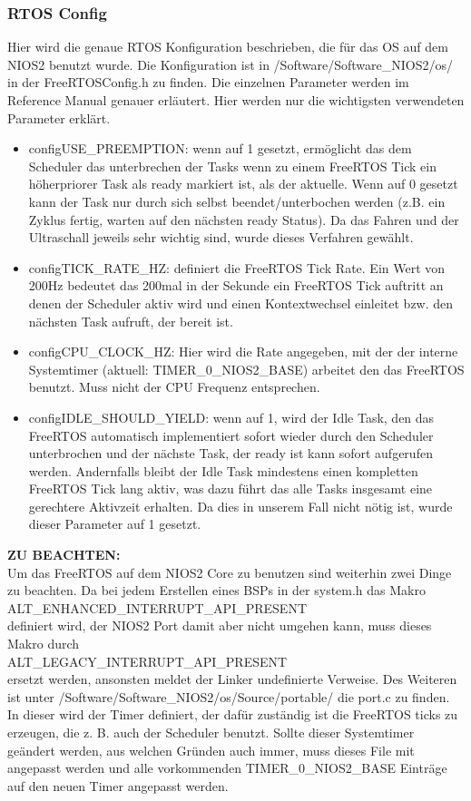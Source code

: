  \subsubsection{RTOS Config}
Hier wird die genaue RTOS Konfiguration beschrieben, die für das OS auf dem NIOS2 benutzt wurde. Die Konfiguration ist in /Software/Software\_NIOS2/os/ in der FreeRTOSConfig.h zu finden. Die einzelnen Parameter werden im Reference Manual genauer erläutert. Hier werden nur die wichtigsten verwendeten Parameter erklärt.
\begin{itemize}
 \item configUSE\_PREEMPTION: wenn auf 1 gesetzt, ermöglicht das dem Scheduler das unterbrechen der Tasks wenn zu einem FreeRTOS Tick ein höherpriorer Task als ready markiert ist, als der aktuelle. Wenn auf 0 gesetzt kann der Task nur durch sich selbst beendet/unterbochen werden (z.B. ein Zyklus fertig, warten auf den nächsten ready Status). Da das Fahren und der Ultraschall jeweils sehr wichtig sind, wurde dieses Verfahren gewählt.
 \item configTICK\_RATE\_HZ: definiert die FreeRTOS Tick Rate. Ein Wert von 200Hz bedeutet das 200mal in der Sekunde ein FreeRTOS Tick auftritt an denen der Scheduler aktiv wird und einen Kontextwechsel einleitet bzw. den nächsten Task aufruft, der bereit ist.
 \item configCPU\_CLOCK\_HZ: Hier wird die Rate angegeben, mit der der interne Systemtimer (aktuell: TIMER\_0\_NIOS2\_BASE) arbeitet den das FreeRTOS benutzt. Muss nicht der CPU Frequenz entsprechen.
 \item configIDLE\_SHOULD\_YIELD: wenn auf 1, wird der Idle Task, den das FreeRTOS automatisch implementiert sofort wieder durch den Scheduler unterbrochen und der nächste Task, der ready ist kann sofort aufgerufen werden. Andernfalls bleibt der Idle Task mindestens einen kompletten FreeRTOS Tick lang aktiv, was dazu führt das alle Tasks insgesamt eine gerechtere Aktivzeit erhalten. Da dies in unserem Fall nicht nötig ist, wurde dieser Parameter auf 1 gesetzt.
\end{itemize}
\textbf{ZU BEACHTEN:}\\Um das FreeRTOS auf dem NIOS2 Core zu benutzen sind weiterhin zwei Dinge zu beachten. Da bei jedem Erstellen eines BSPs in der system.h das Makro\\ ALT\_ENHANCED\_INTERRUPT\_API\_PRESENT\\ definiert wird, der NIOS2 Port damit aber nicht umgehen kann, muss dieses Makro durch\\ ALT\_LEGACY\_INTERRUPT\_API\_PRESENT\\ ersetzt werden, ansonsten meldet der Linker undefinierte Verweise. Des Weiteren ist unter /Software/Software\_NIOS2/os/Source/portable/ die port.c zu finden. In dieser wird der Timer definiert, der dafür zuständig ist die FreeRTOS ticks zu erzeugen, die z. B. auch der Scheduler benutzt. Sollte dieser Systemtimer geändert werden, aus welchen Gründen auch immer, muss dieses File mit angepasst werden und alle vorkommenden TIMER\_0\_NIOS2\_BASE Einträge auf den neuen Timer angepasst werden.
